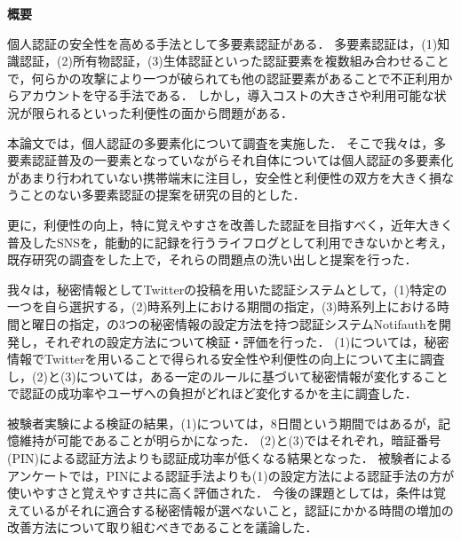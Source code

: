 \thispagestyle{empty}

\noindent
\begin{center}
\LARGE \bf 概要\\
\end{center}

\vspace{1.0cm}
{\small

個人認証の安全性を高める手法として多要素認証がある．
多要素認証は，(1)知識認証，(2)所有物認証，(3)生体認証といった認証要素を複数組み合わせることで，何らかの攻撃により一つが破られても他の認証要素があることで不正利用からアカウントを守る手法である．
しかし，導入コストの大きさや利用可能な状況が限られるといった利便性の面から問題がある．

本論文では，個人認証の多要素化について調査を実施した．
そこで我々は，多要素認証普及の一要素となっていながらそれ自体については個人認証の多要素化があまり行われていない携帯端末に注目し，安全性と利便性の双方を大きく損なうことのない多要素認証の提案を研究の目的とした．

更に，利便性の向上，特に覚えやすさを改善した認証を目指すべく，近年大きく普及したSNSを，能動的に記録を行うライフログとして利用できないかと考え，既存研究の調査をした上で，それらの問題点の洗い出しと提案を行った．

我々は，秘密情報としてTwitterの投稿を用いた認証システムとして，(1)特定の一つを自ら選択する，(2)時系列上における期間の指定，(3)時系列上における時間と曜日の指定，の3つの秘密情報の設定方法を持つ認証システムNotifauthを開発し，それぞれの設定方法について検証・評価を行った．
(1)については，秘密情報でTwitterを用いることで得られる安全性や利便性の向上について主に調査し，(2)と(3)については，ある一定のルールに基づいて秘密情報が変化することで認証の成功率やユーザへの負担がどれほど変化するかを主に調査した．

被験者実験による検証の結果，(1)については，8日間という期間ではあるが，記憶維持が可能であることが明らかになった．
(2)と(3)ではそれぞれ，暗証番号(PIN)による認証方法よりも認証成功率が低くなる結果となった．
被験者によるアンケートでは，PINによる認証手法よりも(1)の設定方法による認証手法の方が使いやすさと覚えやすさ共に高く評価された．
今後の課題としては，条件は覚えているがそれに適合する秘密情報が選べないこと，認証にかかる時間の増加の改善方法について取り組むべきであることを議論した．


}
\normalsize


\newpage
